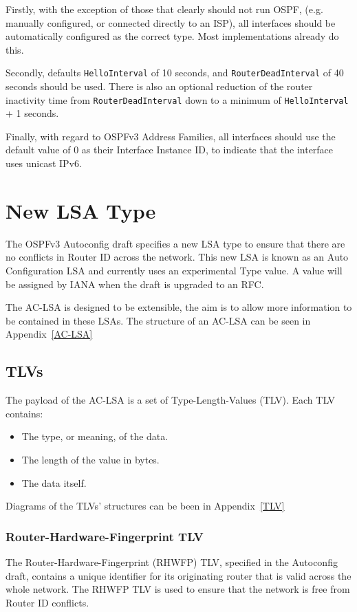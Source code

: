 \documentclass[12pt]{report}
\begin{document}
Firstly, with the exception of those that clearly should not run OSPF, (e.g.\@
manually configured, or connected directly to an ISP), all interfaces
should be automatically configured as the correct type. Most implementations
already do this. 

Secondly, defaults \texttt{HelloInterval} of 10 seconds, and
\texttt{RouterDeadInterval} of 40 seconds should be used. There is also an
optional reduction of the router inactivity time from
\texttt{RouterDeadInterval} down to a minimum of \texttt{HelloInterval} + 1
seconds. 

Finally, with regard to OSPFv3 Address Families, all interfaces should use the
default value of 0 as their Interface Instance ID\@, to indicate that the
interface uses unicast IPv6.  

\section{New LSA Type}
The OSPFv3 Autoconfig draft specifies a new LSA type to ensure that
there are no conflicts in Router ID across the network. This new LSA is known
as an Auto Configuration LSA and currently uses an experimental Type value. A
value will be assigned by IANA when the draft is upgraded to an RFC. 

The AC-LSA is designed to be extensible, the aim is to allow more information
to be contained in these LSAs. The structure of an AC-LSA can be seen in
Appendix~\ref{AC-LSA} 

\subsection{TLVs}
The payload of the AC-LSA is a set of Type-Length-Values (TLV). Each TLV
contains: 
\begin{itemize}
    \item The type, or meaning, of the data.
    \item The length of the value in bytes.
    \item The data itself.
  \end{itemize}

Diagrams of the TLVs' structures can be been in Appendix~\ref{TLV}

\subsubsection{Router-Hardware-Fingerprint TLV}
The Router-Hardware-Fingerprint (RHWFP) TLV, specified in the Autoconfig draft,
contains a unique identifier for its originating router that is valid across
the whole network. The RHWFP TLV is used to ensure that the network is free
from Router ID conflicts.
\end{document}
